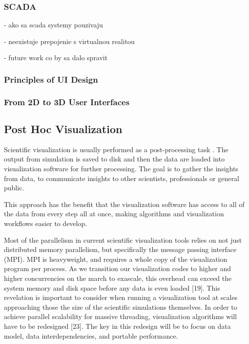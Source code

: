 \subsubsection{SCADA}

- ako sa scada systemy pouzivaju

- neexistuje prepojenie s virtualnou realitou

- future work co by sa dalo spravit

\subsubsection{Principles of UI Design}

\subsubsection{From 2D to 3D User Interfaces}

\subsection{Post Hoc Visualization}

Scientific visualization is usually performed as a post-processing task \citep{kressSituVisualizationTechniques}. The output from simulation is saved to disk and then the data are loaded into visualization software for further processing. The goal is to gather the insights from data, 
to communicate insights to other scientists, professionals or general public. 

This approach has the benefit that the visualization software has access to all of the data from every step all at once, making algorithms and visualization workflows easier to develop.

Most of the parallelism in current scientific visualization tools relies on not just distributed memory parallelism, but specifically the message passing interface (MPI). MPI is heavyweight, and requires a whole copy of the visualization program per process. As we transition our visualization codes to higher and higher concurrencies on the march to exascale, this overhead can exceed the system memory and disk space before any data is even loaded [19]. This revelation is important to consider when running a visualization tool at scales approaching those the size of the scientific simulations themselves.
In order to achieve parallel scalability for massive threading, visualization algorithms will have to be redesigned [23]. The key in this redesign will be to focus on data model, data interdependencies, and portable performance.

